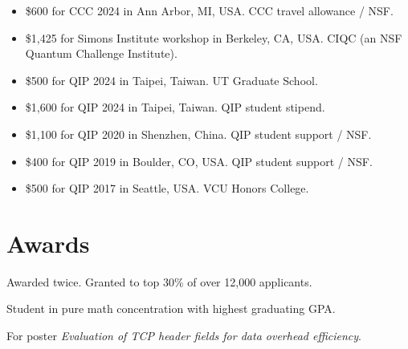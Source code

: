 \documentclass[11pt,letterpaper,serif]{moderncv}
\begin{document}
\begin{itemize}
	\item \$600 for CCC 2024 in Ann Arbor, MI, USA. CCC travel allowance / NSF.
	\item \$1,425 for Simons Institute workshop in Berkeley, CA, USA. CIQC (an NSF Quantum Challenge Institute).
	\item \$500 for QIP 2024 in Taipei, Taiwan. UT Graduate School.
	\item \$1,600 for QIP 2024 in Taipei, Taiwan. QIP student stipend.
	\item \$1,100 for QIP 2020 in Shenzhen, China. QIP student support / NSF.
	\item \$400 for QIP 2019 in Boulder, CO, USA. QIP student support / NSF.
	\item \$500 for QIP 2017 in Seattle, USA. VCU Honors College.
\end{itemize}




\section{Awards}

{
	\begin{adjustwidth}{.25in}{}
		Awarded twice. Granted to top 30\% of over 12,000 applicants.
	\end{adjustwidth}
}

{
	\begin{adjustwidth}{.25in}{}
		Student in pure math concentration with highest graduating GPA.
	\end{adjustwidth}
}


{
	\begin{adjustwidth}{.25in}{}
		For poster \textit{Evaluation of TCP header fields for data overhead efficiency}.
	\end{adjustwidth}
}
\end{document}
